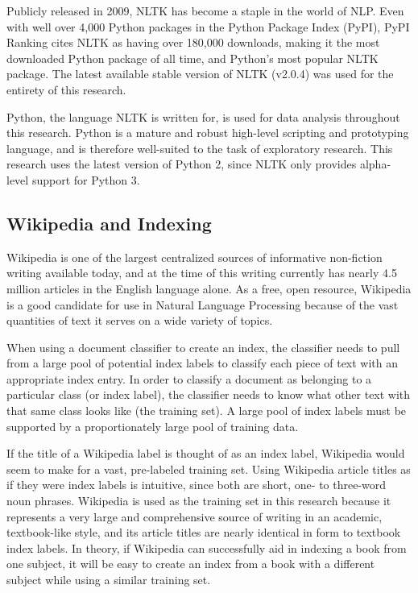 Publicly released in 2009, NLTK has become a staple in the world of NLP.
Even with well over 4,000 Python packages in the Python Package Index (PyPI), PyPI Ranking cites NLTK as having over 180,000 downloads, making it the  most downloaded Python package of all time, and Python's most popular NLTK package\cite{pypi-ranking}.
The latest available stable version of NLTK (v2.0.4) was used for the entirety of this research.

Python, the language NLTK is written for, is used for data analysis throughout this research.
Python is a mature and robust high-level scripting and prototyping language, and is therefore well-suited to the task of exploratory research.
This research uses the latest version of Python 2, since NLTK only provides alpha-level support for Python 3\cite{nltk-install}.

\subsection{Wikipedia and Indexing}

Wikipedia is one of the largest centralized sources of informative non-fiction writing available today, and at the time of this writing currently has nearly 4.5 million articles in the English language alone\cite{wikipedia}.
As a free, open resource, Wikipedia is a good candidate for use in Natural Language Processing because of the vast quantities of text it serves on a wide variety of topics.

When using a document classifier to create an index, the classifier needs to pull from a large pool of potential index labels to classify each piece of text with an appropriate index entry.
In order to classify a document as belonging to a particular class (or index label), the classifier needs to know what other text with that same class looks like (the training set).
A large pool of index labels must be supported by a proportionately large pool of training data.

If the title of a Wikipedia label is thought of as an index label, Wikipedia would seem to make for a vast, pre-labeled training set.
Using Wikipedia article titles as if they were index labels is intuitive, since both are short, one- to three-word noun phrases.
Wikipedia is used as the training set in this research because it represents a very large and comprehensive source of writing in an academic, textbook-like style, and its article titles are nearly identical in form to textbook index labels.
In theory, if Wikipedia can successfully aid in indexing a book from one subject, it will be easy to create an index from a book with a different subject while using a similar training set.